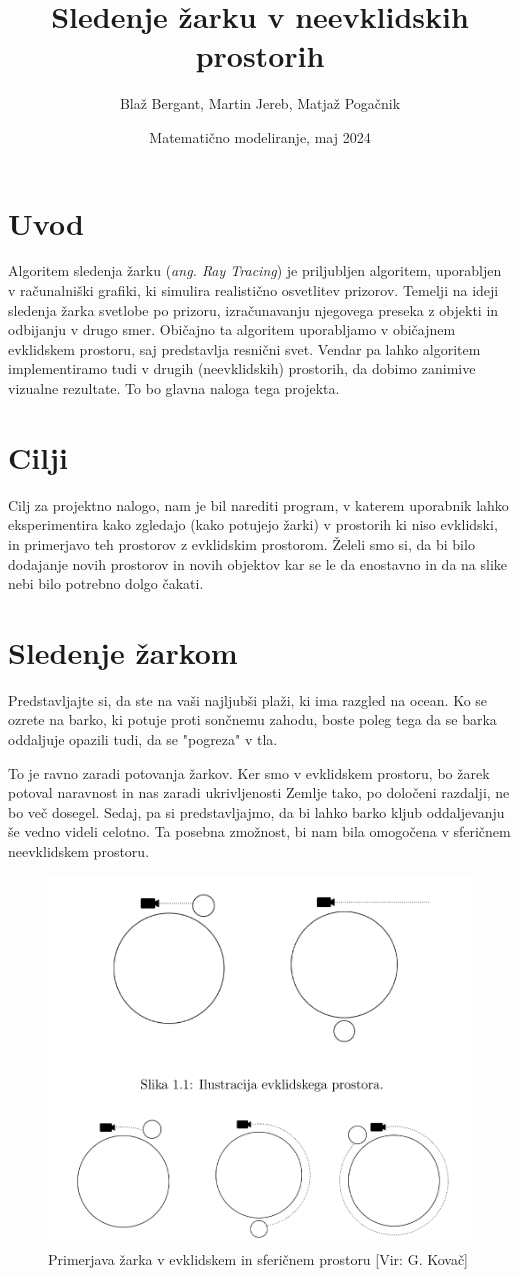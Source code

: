 \documentclass[titlepage]{article}
\title{Sledenje žarku v neevklidskih prostorih}
\author{Blaž Bergant, Martin Jereb, Matjaž Pogačnik}
\date{Matematično modeliranje, maj 2024}
\begin{document}
\maketitle
\newpage
\tableofcontents
\newpage

\section{Uvod}
Algoritem sledenja žarku (\textit{ang. Ray Tracing}) je priljubljen algoritem, uporabljen v 
računalniški grafiki, ki simulira realistično osvetlitev prizorov. Temelji na ideji sledenja 
žarka svetlobe po prizoru, izračunavanju njegovega preseka z objekti in odbijanju v drugo smer. 
Običajno ta algoritem uporabljamo v običajnem evklidskem prostoru, saj predstavlja resnični svet. 
Vendar pa lahko algoritem implementiramo tudi v drugih (neevklidskih) prostorih, da dobimo 
zanimive vizualne rezultate. To bo glavna naloga tega projekta.

\section{Cilji}
Cilj za projektno nalogo, nam je bil narediti program, v katerem uporabnik lahko eksperimentira 
kako zgledajo (kako potujejo žarki) v prostorih ki niso evklidski, in primerjavo teh prostorov z 
evklidskim prostorom. Želeli smo si, da bi bilo dodajanje novih prostorov in novih objektov kar 
se le da enostavno in da na slike nebi bilo potrebno dolgo čakati.
\section{Sledenje žarkom}
Predstavljajte si, da ste na vaši najljubši plaži, ki ima razgled na ocean. Ko se ozrete na barko,
ki potuje proti sončnemu zahodu, boste poleg tega da se barka oddaljuje opazili tudi, da se "pogreza" 
v tla.

To je ravno zaradi potovanja žarkov. Ker smo v evklidskem prostoru, bo žarek potoval naravnost in nas 
zaradi ukrivljenosti Zemlje tako, po določeni razdalji, ne bo več dosegel. Sedaj, pa si predstavljajmo, 
da bi lahko barko kljub oddaljevanju še vedno videli celotno. Ta posebna zmožnost, bi nam bila 
omogočena v sferičnem neevklidskem prostoru.

\begin{figure}[H]
    \centering
    \includegraphics[width=0.5\linewidth]{Images/potovanje_zarkov.png}
    \caption{Primerjava žarka v evklidskem in sferičnem prostoru [Vir: G. Kovač]}
    \label{Slika:Primerjava žarkov evklidski, sferični}
\end{figure}
\end{document}
